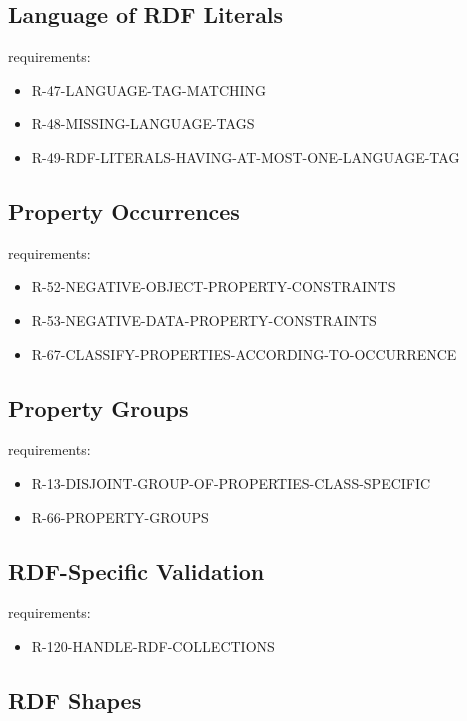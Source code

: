 \documentclass{llncs}
\begin{document}
\subsection{Language of RDF Literals}

requirements:

\begin{itemize}
	\item R-47-LANGUAGE-TAG-MATCHING
  \item R-48-MISSING-LANGUAGE-TAGS
	\item R-49-RDF-LITERALS-HAVING-AT-MOST-ONE-LANGUAGE-TAG
\end{itemize}

\subsection{Property Occurrences}

requirements:

\begin{itemize}
	\item R-52-NEGATIVE-OBJECT-PROPERTY-CONSTRAINTS
	\item R-53-NEGATIVE-DATA-PROPERTY-CONSTRAINTS
	\item R-67-CLASSIFY-PROPERTIES-ACCORDING-TO-OCCURRENCE
\end{itemize}

\subsection{Property Groups}

requirements:

\begin{itemize}
	\item R-13-DISJOINT-GROUP-OF-PROPERTIES-CLASS-SPECIFIC
	\item R-66-PROPERTY-GROUPS
\end{itemize}

\subsection{RDF-Specific Validation}

requirements:

\begin{itemize}
	\item R-120-HANDLE-RDF-COLLECTIONS
\end{itemize}

\subsection{RDF Shapes}
\end{document}
